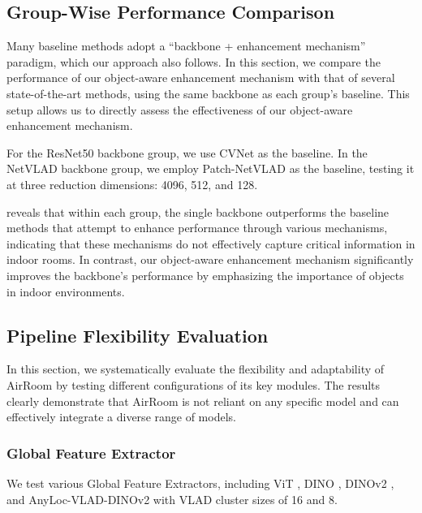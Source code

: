 \subsection{Group-Wise Performance Comparison}
\label{sec:section4.5}
\vspace{-3pt}
Many baseline methods adopt a “backbone + enhancement mechanism” paradigm, which our approach also follows. In this section, we compare the performance of our object-aware enhancement mechanism with that of several state-of-the-art methods, using the same backbone as each group’s baseline. This setup allows us to directly assess the effectiveness of our object-aware enhancement mechanism.

For the ResNet50 backbone group, we use CVNet \cite{lee2022correlationverificationimageretrieval} as the baseline. In the NetVLAD backbone group, we employ Patch-NetVLAD \cite{hausler2021patchnetvladmultiscalefusionlocallyglobal} as the baseline, testing it at three reduction dimensions: 4096, 512, and 128.

 reveals that within each group, the single backbone outperforms the baseline methods that attempt to enhance performance through various mechanisms, indicating that these mechanisms do not effectively capture critical information in indoor rooms. In contrast, our object-aware enhancement mechanism significantly improves the backbone’s performance by emphasizing the importance of \mbox{objects} in indoor environments.

\subsection{Pipeline Flexibility Evaluation}
\label{sec:section4.6}
\vspace{-3pt}
In this section, we systematically evaluate the flexibility and adaptability of AirRoom by testing different configurations of its key modules. The results clearly demonstrate that AirRoom is not reliant on any specific model and can effectively integrate a diverse range of models.

\vspace{-5pt}
\subsubsection{Global Feature Extractor}
\vspace{-4pt}
We test various Global Feature Extractors, including ViT \cite{dosovitskiy2021imageworth16x16words}, DINO \cite{caron2021emergingpropertiesselfsupervisedvision}, DINOv2 \cite{oquab2024dinov2learningrobustvisual}, and AnyLoc-VLAD-DINOv2 \cite{keetha2023anylocuniversalvisualplace} with VLAD cluster sizes of 16 and 8.

